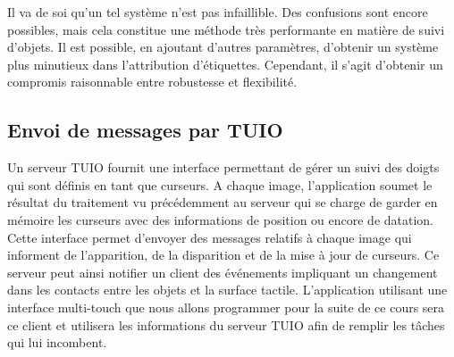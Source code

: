 Il va de soi qu’un tel système n’est pas infaillible. Des confusions sont encore possibles, mais
cela constitue une méthode très performante en matière de suivi d’objets. Il est possible, en ajoutant
d’autres paramètres, d’obtenir un système plus minutieux dans l’attribution d’étiquettes. Cependant,
il s’agit d’obtenir un compromis raisonnable entre robustesse et flexibilité.\\

\subsection{Envoi de messages par TUIO}
Un serveur TUIO fournit une interface permettant de gérer un suivi des doigts qui sont définis
en tant que curseurs. A chaque image, l’application soumet le résultat du traitement vu
précédemment au serveur qui se charge de garder en mémoire les curseurs avec des informations de
position ou encore de datation. Cette interface permet d’envoyer des messages relatifs à chaque
image qui informent de l’apparition, de la disparition et de la mise à jour de curseurs. Ce serveur
peut ainsi notifier un client des événements impliquant un changement dans les contacts entre les
objets et la surface tactile. L’application utilisant une interface multi-touch que nous allons
programmer pour la suite de ce cours sera ce client et utilisera les informations du serveur TUIO afin
de remplir les tâches qui lui incombent.
